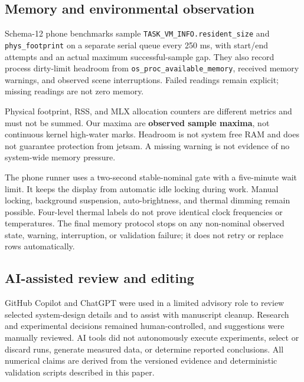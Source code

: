 \documentclass[11pt]{article}
\begin{document}
\hypertarget{memory-and-environmental-observation}{%
\subsection{Memory and environmental observation}\label{memory-and-environmental-observation}}

Schema-12 phone benchmarks sample \texttt{TASK\_VM\_INFO.resident\_size} and
\texttt{phys\_footprint} on a separate serial queue every 250 ms, with start/end
attempts and an actual maximum successful-sample gap. They also record
process dirty-limit headroom from \texttt{os\_proc\_available\_memory}, received
memory warnings, and observed scene interruptions. Failed readings remain
explicit; missing readings are not zero memory.

Physical footprint, RSS, and MLX allocation counters are different metrics
and must not be summed. Our maxima are \textbf{observed sample maxima}, not continuous
kernel high-water marks. Headroom is not system free RAM and does not
guarantee protection from jetsam. A missing warning is not evidence of
no system-wide memory pressure.

The phone runner uses a two-second stable-nominal gate with a five-minute
wait limit. It keeps the display from automatic idle locking during work.
Manual locking, background suspension, auto-brightness, and thermal dimming
remain possible. Four-level thermal labels do not prove identical clock
frequencies or temperatures. The final memory protocol stops on any
non-nominal observed state, warning, interruption, or validation failure;
it does not retry or replace rows automatically.

\hypertarget{ai-assisted-review-and-editing}{%
\subsection{AI-assisted review and editing}\label{ai-assisted-review-and-editing}}

GitHub Copilot and ChatGPT were used in a limited advisory role to review selected system-design details and to assist with manuscript cleanup. Research and experimental decisions remained human-controlled, and suggestions were manually reviewed. AI tools did not autonomously execute experiments, select or discard runs, generate measured data, or determine reported conclusions. All numerical claims are derived from the versioned evidence and deterministic validation scripts described in this paper.
\end{document}

